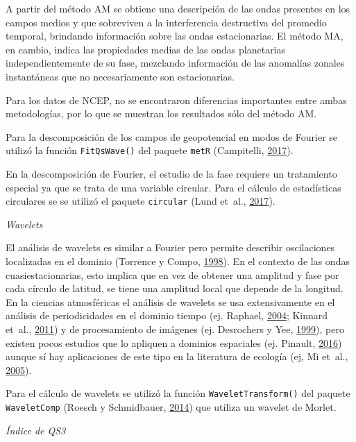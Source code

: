 \documentclass[spanish,a4paper,12pt]{book}
\begin{document}
A partir del método AM se obtiene una descripción de las ondas presentes
en los campos medios y que sobreviven a la interferencia destructiva del
promedio temporal, brindando información sobre las ondas estacionarias.
El método MA, en cambio, indica las propiedades medias de las ondas
planetarias independientemente de su fase, mezclando información de las
anomalías zonales instantáneas que no necesariamente son estacionarias.

Para los datos de NCEP, no se encontraron diferencias importantes entre
ambas metodologías, por lo que se muestran los resultados sólo del
método AM.

Para la descomposición de los campos de geopotencial en modos de Fourier
se utilizó la función \texttt{FitQsWave()} del paquete \texttt{metR}
(Campitelli, \protect\hyperlink{ref-R-metR}{2017}).

En la descomposición de Fourier, el estudio de la fase requiere un
tratamiento especial ya que se trata de una variable circular. Para el
cálculo de estadísticas circulares se se utilizó el paquete
\texttt{circular} (Lund et~al.,
\protect\hyperlink{ref-R-circular}{2017}).

\emph{Wavelets}

El análisis de wavelets es similar a Fourier pero permite describir
oscilaciones localizadas en el dominio (Torrence y Compo,
\protect\hyperlink{ref-Torrence1998}{1998}). En el contexto de las ondas
cuasiestacionarias, esto implica que en vez de obtener una amplitud y
fase por cada círculo de latitud, se tiene una amplitud local que
depende de la longitud. En la ciencias atmosféricas el análisis de
wavelets se usa extensivamente en el análisis de periodicidades en el
dominio tiempo (ej. Raphael, \protect\hyperlink{ref-Raphael2004}{2004};
Kinnard et~al., \protect\hyperlink{ref-Kinnard2011}{2011}) y de
procesamiento de imágenes (ej. Desrochers y Yee,
\protect\hyperlink{ref-Desrochers1999}{1999}), pero existen pocos
estudios que lo apliquen a dominios espaciales (ej. Pinault,
\protect\hyperlink{ref-Pinault2016}{2016}) aunque sí hay aplicaciones de
este tipo en la literatura de ecología (ej, Mi et~al.,
\protect\hyperlink{ref-Mi2005}{2005}).

Para el cálculo de wavelets se utilizó la función
\texttt{WaveletTransform()} del paquete \texttt{WaveletComp} (Roesch y
Schmidbauer, \protect\hyperlink{ref-R-WaveletComp}{2014}) que utiliza un
wavelet de Morlet.

\emph{Índice de QS3}
\end{document}
